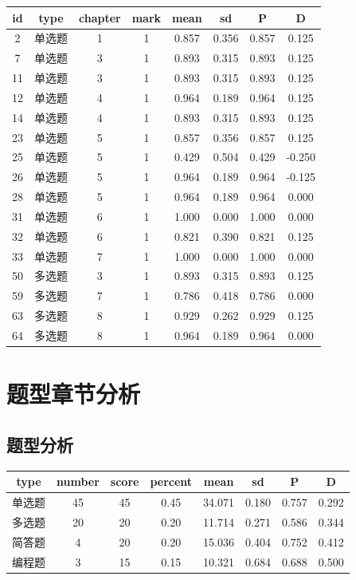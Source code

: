 \documentclass[hyperref,adobefonts]{ctexart}
\begin{document}
\begin{longtable}{c|c|c|c|c|c|c|c}
\hline
id & type & chapter & mark & mean & sd & P & D\\
\hline
2 & 单选题 & 1 & 1 & 0.857 & 0.356 & 0.857 & 0.125\\
\hline
7 & 单选题 & 3 & 1 & 0.893 & 0.315 & 0.893 & 0.125\\
\hline
11 & 单选题 & 3 & 1 & 0.893 & 0.315 & 0.893 & 0.125\\
\hline
12 & 单选题 & 4 & 1 & 0.964 & 0.189 & 0.964 & 0.125\\
\hline
14 & 单选题 & 4 & 1 & 0.893 & 0.315 & 0.893 & 0.125\\
\hline
23 & 单选题 & 5 & 1 & 0.857 & 0.356 & 0.857 & 0.125\\
\hline
25 & 单选题 & 5 & 1 & 0.429 & 0.504 & 0.429 & -0.250\\
\hline
26 & 单选题 & 5 & 1 & 0.964 & 0.189 & 0.964 & -0.125\\
\hline
28 & 单选题 & 5 & 1 & 0.964 & 0.189 & 0.964 & 0.000\\
\hline
31 & 单选题 & 6 & 1 & 1.000 & 0.000 & 1.000 & 0.000\\
\hline
32 & 单选题 & 6 & 1 & 0.821 & 0.390 & 0.821 & 0.125\\
\hline
33 & 单选题 & 7 & 1 & 1.000 & 0.000 & 1.000 & 0.000\\
\hline
50 & 多选题 & 3 & 1 & 0.893 & 0.315 & 0.893 & 0.125\\
\hline
59 & 多选题 & 7 & 1 & 0.786 & 0.418 & 0.786 & 0.000\\
\hline
63 & 多选题 & 8 & 1 & 0.929 & 0.262 & 0.929 & 0.125\\
\hline
64 & 多选题 & 8 & 1 & 0.964 & 0.189 & 0.964 & 0.000\\
\hline
\end{longtable}

\section{题型章节分析}

\subsection{题型分析}

\begin{longtable}{c|c|c|c|c|c|c|c}
\hline
type & number & score & percent & mean & sd & P & D\\
\hline
单选题 & 45 & 45 & 0.45 & 34.071 & 0.180 & 0.757 & 0.292\\
\hline
多选题 & 20 & 20 & 0.20 & 11.714 & 0.271 & 0.586 & 0.344\\
\hline
简答题 & 4 & 20 & 0.20 & 15.036 & 0.404 & 0.752 & 0.412\\
\hline
编程题 & 3 & 15 & 0.15 & 10.321 & 0.684 & 0.688 & 0.500\\
\hline
\end{longtable}
\end{document}
